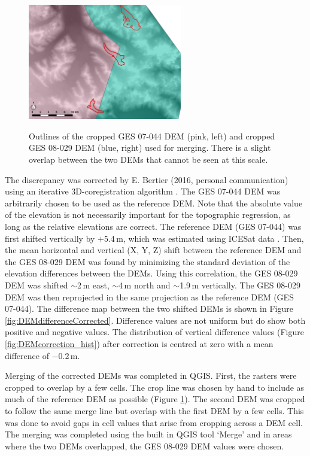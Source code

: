 \documentclass{sfuthesis}
\begin{document}
{\begin{figure}
	\centering
	\includegraphics[width = 0.6\textwidth]{mergeLine.jpeg}\\
	\caption[Outlines of the cropped GES 07-044 DEM and cropped GES 08-029 DEM used for merging]{Outlines of the cropped GES 07-044 DEM (pink, left) and cropped GES 08-029 DEM (blue, right) used for merging. There is a slight overlap between the two DEMs that cannot be seen at this scale.}
	\label{fig:mergeLine}
\end{figure}

The discrepancy was corrected by E. Bertier (2016, personal communication) using an iterative 3D-coregistration algorithm \citep{Berthier2007}. The GES 07-044 DEM was arbitrarily chosen to be used as the reference DEM. Note that the absolute value of the elevation is not necessarily important for the topographic regression, as long as the relative elevations are correct. The reference DEM (GES 07-044) was first shifted vertically by $+$5.4\,m, which was estimated using ICESat data \citep{Berthier2010}. Then, the mean horizontal and vertical (X, Y, Z) shift between the reference DEM and the GES 08-029 DEM was found by minimizing the standard deviation of the elevation differences between the DEMs. Using this correlation, the GES 08-029 DEM  was shifted $\sim$2\,m east, $\sim$4\,m north and $\sim$1.9\,m vertically. The GES 08-029 DEM was then reprojected in the same projection as the reference DEM (GES 07-044). The difference map between the two shifted DEMs is shown in Figure \ref{fig:DEMdifferenceCorrected}. Difference values are not uniform but do show both positive and negative values. The distribution of vertical difference values (Figure \ref{fig:DEMcorrection_hist}) after correction is centred at zero with a mean difference of $-$0.2\,m.

Merging of the corrected DEMs was completed in QGIS. First, the rasters were cropped to overlap by a few cells. The crop line was chosen by hand to include as much of the reference DEM as possible (Figure \ref{fig:mergeLine}). The second DEM was cropped to follow the same merge line but overlap with the first DEM by a few cells. This was done to avoid gaps in cell values that arise from cropping across a DEM cell. The merging was completed using the built in QGIS tool `Merge' and in areas where the two DEMs overlapped, the GES 08-029 DEM values were chosen.

}
\end{document}
